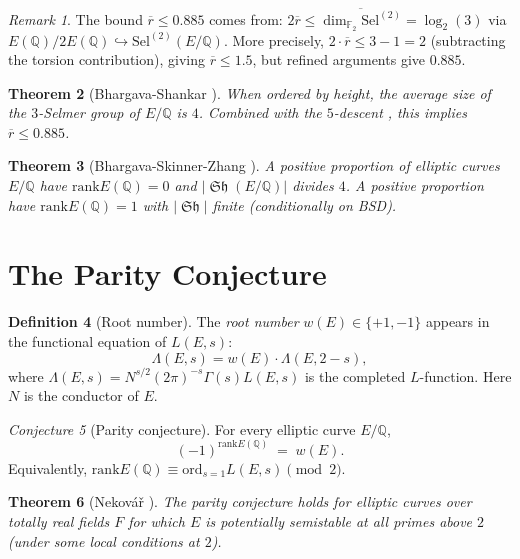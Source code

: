 \documentclass[12pt,a4paper]{amsart}
\newtheorem{theorem}{Theorem}[section]
\theoremstyle{definition}
\newtheorem{definition}[theorem]{Definition}
\theoremstyle{remark}
\newtheorem{remark}[theorem]{Remark}
\newtheorem{conjecture}[theorem]{Conjecture}
\newcommand{\Q}{\mathbb{Q}}
\newcommand{\F}{\mathbb{F}}
\newcommand{\Sel}{\mathrm{Sel}}
\DeclareMathOperator{\Sha}{\mathfrak{Sh}}
\newcommand{\rank}{\mathrm{rank}}
\newcommand{\ord}{\mathrm{ord}}
\begin{document}
\begin{remark}
  The bound $\overline{r} \leq 0.885$ comes from:
  $2\overline{r} \leq \overline{\dim_{\F_2} \Sel^{(2)}} = \log_2(3)$
  via $E(\Q)/2E(\Q) \hookrightarrow \Sel^{(2)}(E/\Q)$.
  More precisely, $2 \cdot \overline{r} \leq 3 - 1 = 2$ (subtracting the torsion
  contribution), giving $\overline{r} \leq 1.5$, but refined arguments give $0.885$.
\end{remark}

\begin{theorem}[Bhargava-Shankar \cite{BS2015a}]
  When ordered by height, the average size of the $3$-Selmer group of $E/\Q$ is $4$.
  Combined with the $5$-descent \cite{BS2013}, this implies $\overline{r} \leq 0.885$.
\end{theorem}

\begin{theorem}[Bhargava-Skinner-Zhang \cite{BSZ2014}]
  A positive proportion of elliptic curves $E/\Q$ have $\rank E(\Q) = 0$ and
  $|\Sha(E/\Q)|$ divides $4$.
  A positive proportion have $\rank E(\Q) = 1$ with $|\Sha|$ finite (conditionally on BSD).
\end{theorem}

\section{The Parity Conjecture}\label{sec:parity}

\begin{definition}[Root number]
  The \emph{root number} $w(E) \in \{+1, -1\}$ appears in the functional equation of
  $L(E,s)$:
  \[
    \Lambda(E,s) = w(E) \cdot \Lambda(E, 2-s),
  \]
  where $\Lambda(E,s) = N^{s/2}(2\pi)^{-s}\Gamma(s) L(E,s)$ is the completed
  $L$-function. Here $N$ is the conductor of $E$.
\end{definition}

\begin{conjecture}[Parity conjecture]\label{conj:parity}
  For every elliptic curve $E/\Q$,
  \[
    (-1)^{\rank E(\Q)} \;=\; w(E).
  \]
  Equivalently, $\rank E(\Q) \equiv \ord_{s=1} L(E,s) \pmod{2}$.
\end{conjecture}

\begin{theorem}[Nekovář \cite{Nekovar2009}]
  The parity conjecture holds for elliptic curves over totally real fields
  $F$ for which $E$ is potentially semistable at all primes above $2$
  (under some local conditions at $2$).
\end{theorem}
\end{document}
